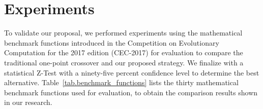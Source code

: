 \documentclass[graybox]{svmult}
\begin{document}
    \FloatBarrier


\section{Experiments}
    \label{section.experiments}

    To validate our proposal, we performed experiments using the mathematical benchmark functions introduced in the Competition on Evolutionary Computation for the 2017 edition (CEC-2017) for evaluation to compare the traditional one-point crossover and our proposed strategy. We finalize with a statistical Z-Test with a ninety-five percent confidence level to determine the best alternative. Table~\ref{tab.benchmark_functions} lists the thirty mathematical benchmark functions used for evaluation, to obtain the comparison results shown in our research.
\end{document}
